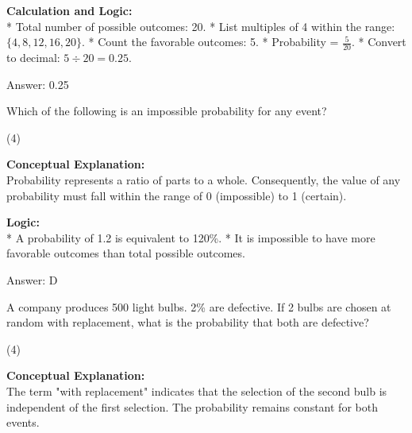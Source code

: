 \documentclass[11pt,paper=a4,answers]{exam}
\begin{document}
\begin{questions}
\begin{solution}
\textbf{Calculation and Logic:} \\
* Total number of possible outcomes: 20.
* List multiples of 4 within the range: $\{4, 8, 12, 16, 20\}$.
* Count the favorable outcomes: 5.
* Probability = $\frac{5}{20}$.
* Convert to decimal: $5 \div 20 = 0.25$.

\vspace{30pt}

Answer: \colorbox{yellow!100}{0.25}
\end{solution}

\vspace{60pt}

\question
Which of the following is an impossible probability for any event?
\begin{tasks}(4)
\end{tasks}

\begin{solution}
\textbf{Conceptual Explanation:} \\
Probability represents a ratio of parts to a whole. Consequently, the value of any probability must fall within the range of 0 (impossible) to 1 (certain).

\vspace{30pt}

\textbf{Logic:} \\
* A probability of 1.2 is equivalent to 120\%.
* It is impossible to have more favorable outcomes than total possible outcomes.

\vspace{30pt}

Answer: \colorbox{yellow!100}{D}
\end{solution}

\vspace{60pt}

\question
A company produces 500 light bulbs. 2\% are defective. If 2 bulbs are chosen at random with replacement, what is the probability that both are defective?
\begin{tasks}(4)
    \end{tasks}

\begin{solution}
\textbf{Conceptual Explanation:} \\
The term "with replacement" indicates that the selection of the second bulb is independent of the first selection. The probability remains constant for both events.


\end{solution}
\end{questions}
\end{document}

